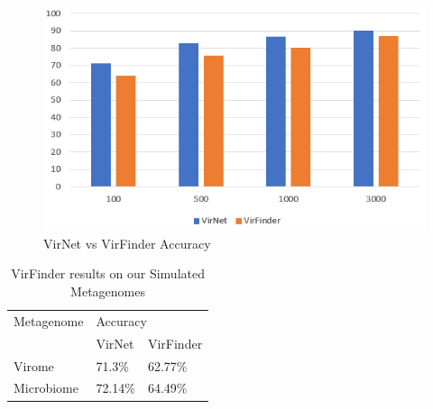\documentclass[conference]{IEEEtran}
\begin{document}
\begin{figure}
	\centering
	\includegraphics[width=\columnwidth]{imgs/accuracy_graph.PNG}
	\caption{VirNet vs VirFinder Accuracy}
	\label{fig:accuracy_graph}
\end{figure}






\begin{table}[!htbp]
	\centering
	\begin{tabular}{||l l l||} 
		Metagenome &	\multicolumn{2}{l}{Accuracy} \\ [0.5ex] 
		& VirNet & VirFinder  \\
		\hline\hline
		Virome & 71.3\% &	62.77\%	 \\
		Microbiome &	72.14\% & 64.49\% \\ [1ex]
	\end{tabular}
	\caption{VirFinder results on our Simulated Metagenomes}
	\label{table:virfinder_results_simulated}
\end{table}
\end{document}
